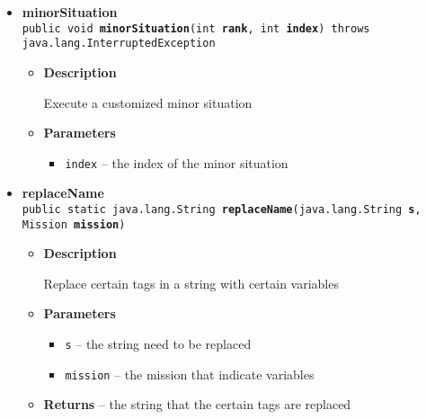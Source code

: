 {{{\begin{itemize}
{\begin{itemize}
{Generate a random mission
}
\item{
{\bf  Parameters}
  \begin{itemize}
   \item{
\texttt{area} -- the area of the mission}
   \item{
\texttt{rank} -- the rank that the mission is designed for}
  \end{itemize}
}%
\item{{\bf  Returns} -- 
generated mission object 
}%
\end{itemize}
}%
\item{ 
{\bf  minorSituation}\\
\texttt{public void\ {\bf  minorSituation}(\texttt{int} {\bf  rank},
\texttt{int} {\bf  index}) throws java.lang.InterruptedException
\label{personOfInterest.Mission.minorSituation(int, int)}}%
\begin{itemize}
\item{
{\bf  Description}

Execute a customized minor situation
}
\item{
{\bf  Parameters}
  \begin{itemize}
   \item{
\texttt{index} -- the index of the minor situation}
  \end{itemize}
}%
\end{itemize}
}%
\item{ 
{\bf  replaceName}\\
\texttt{public static java.lang.String\ {\bf  replaceName}(\texttt{java.lang.String} {\bf  s},
\texttt{Mission} {\bf  mission})
\label{personOfInterest.Mission.replaceName(java.lang.String, personOfInterest.Mission)}}%
\begin{itemize}
\item{
{\bf  Description}

Replace certain tags in a string with certain variables
}
\item{
{\bf  Parameters}
  \begin{itemize}
   \item{
\texttt{s} -- the string need to be replaced}
   \item{
\texttt{mission} -- the mission that indicate variables}
  \end{itemize}
}%
\item{{\bf  Returns} -- 
the string that the certain tags are replaced 
}%
\end{itemize}
}%
\end{itemize}
}
}
}
